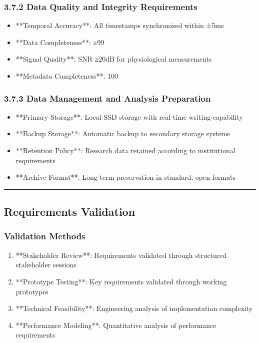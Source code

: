 \documentclass[12pt,a4paper]{article}
\begin{document}
\subsubsection{3.7.2 Data Quality and Integrity Requirements}

\begin{itemize}
\item **Temporal Accuracy**: All timestamps synchronized within ±5ms
\item **Data Completeness**: ≥99%
\item **Signal Quality**: SNR ≥20dB for physiological measurements
\item **Metadata Completeness**: 100%

\end{itemize}
\subsubsection{3.7.3 Data Management and Analysis Preparation}

\begin{itemize}
\item **Primary Storage**: Local SSD storage with real-time writing capability
\item **Backup Storage**: Automatic backup to secondary storage systems
\item **Retention Policy**: Research data retained according to institutional requirements
\item **Archive Format**: Long-term preservation in standard, open formats

\end{itemize}
\hrule

\subsection{Requirements Validation}

\subsubsection{Validation Methods}

\begin{enumerate}
\item **Stakeholder Review**: Requirements validated through structured stakeholder sessions
\item **Prototype Testing**: Key requirements validated through working prototypes
\item **Technical Feasibility**: Engineering analysis of implementation complexity
\item **Performance Modeling**: Quantitative analysis of performance requirements

\end{enumerate}
\end{document}
